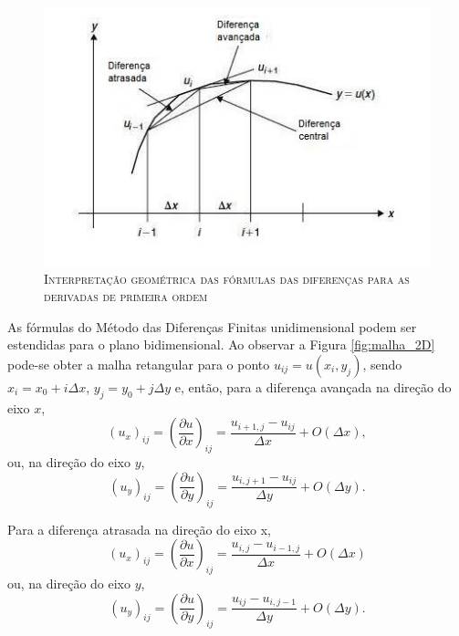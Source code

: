 \begin{figure}[H]
	\centering
	\includegraphics[scale=1]{figuras/inter_geom.jpg}
	\caption{\textsc{Interpretação geométrica das fórmulas das diferenças para as derivadas de primeira ordem}}
	\vspace{-0.1cm}
	\label{fig:inter_geom}
\end{figure}

As fórmulas do Método das Diferenças Finitas unidimensional podem ser estendidas para o plano bidimensional. Ao observar a Figura \ref{fig:malha_2D} pode-se obter a malha retangular para o ponto $u_{ij} = u(x_i , y_j)$, sendo $ x_i = x_0 + i \Delta x$,  $ y_j = y_0 + j \Delta y$ e, então, para a diferença avançada na direção do eixo $x$,
\begin{equation} \label{avdir_x}
(u_x)_{ij} = \left( \frac{ \partial u}{ \partial x} \right)_{ij} = \frac{ u_{i+1,j} - u_{ij}}{ \Delta x} + O( \Delta x),
\end{equation}
ou, na direção do eixo $y$,
\begin{equation} \label{avdir_y}
(u_y)_{ij} = \left( \frac{ \partial u}{ \partial y} \right)_{ij} = \frac{ u_{i,j+1} - u_{ij}}{ \Delta y} + O( \Delta y) .
\end{equation}

Para a diferença atrasada na direção do eixo x,
\begin{equation} \label{atdir_x}
(u_x)_{ij} = \left( \frac{ \partial u}{ \partial x} \right)_{ij} = \frac{ u_{i,j} - u_{i-1,j}}{ \Delta x} + O( \Delta x)
\end{equation}
ou, na direção do eixo $y$,
\begin{equation} \label{atdir_y}
(u_y)_{ij} = \left( \frac{ \partial u}{ \partial y} \right)_{ij} = \frac{ u_{ij} - u_{i,j-1}}{ \Delta y} + O( \Delta y) .
\end{equation}

